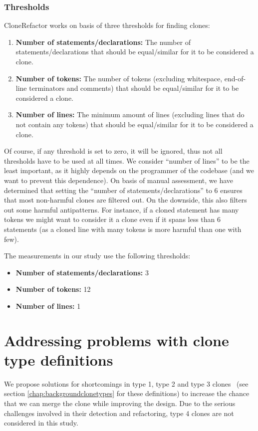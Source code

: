 \documentclass[a4paper]{article}
\begin{document}
\subsubsection{Thresholds}\label{chap:thresholds}
CloneRefactor works on basis of three thresholds for finding clones:
\begin{enumerate}
  \item \textbf{Number of statements/declarations:} The number of statements/declarations that should be equal/similar for it to be considered a clone.
  \item \textbf{Number of tokens:} The number of tokens (excluding whitespace, end-of-line terminators and comments) that should be equal/similar for it to be considered a clone.
  \item \textbf{Number of lines:} The minimum amount of lines (excluding lines that do not contain any tokens) that should be equal/similar for it to be considered a clone.
\end{enumerate}
Of course, if any threshold is set to zero, it will be ignored, thus not all thresholds have to be used at all times. We consider ``number of lines'' to be the least important, as it highly depends on the programmer of the codebase (and we want to prevent this dependence). On basis of manual assessment, we have determined that setting the ``number of statements/declarations'' to 6 ensures that most non-harmful clones are filtered out. On the downside, this also filters out some harmful antipatterns. For instance, if a cloned statement has many tokens we might want to consider it a clone even if it spans less than 6 statements (as a cloned line with many tokens is more harmful than one with few).

The measurements in our study use the following thresholds:
\begin{itemize}
  \item \textbf{Number of statements/declarations:} 3
  \item \textbf{Number of tokens:} 12
  \item \textbf{Number of lines:} 1
\end{itemize}

\section{Addressing problems with clone type definitions}\label{chap:clonetypes}
We propose solutions for shortcomings in type 1, type 2 and type 3 clones~\cite{roy2007survey} (see section \ref{chap:backgroundclonetypes} for these definitions) to increase the chance that we can merge the clone while improving the design. Due to the serious challenges involved in their detection and refactoring, type 4 clones are not considered in this study.
\end{document}
